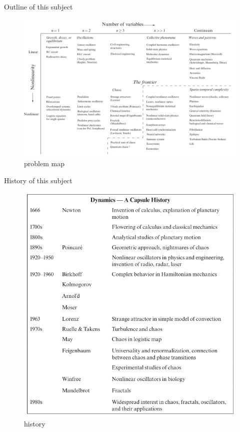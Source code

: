\documentclass[9pt,aspectratio=43,mathserif,table]{beamer}
\begin{document}
\begin{frame}{Outline of this subject}
     \begin{figure}[!h]
      \centering
      \includegraphics[width=.9\textwidth]{fig/problemMap.png}
      \caption{problem map}
    \end{figure}  
\end{frame}

\begin{frame}{History of this subject}
    \begin{figure}[!h]
      \centering
      \includegraphics[width=.5\textwidth]{fig/history.png}
      \caption{history}
    \end{figure}
\end{frame}
\end{document}
